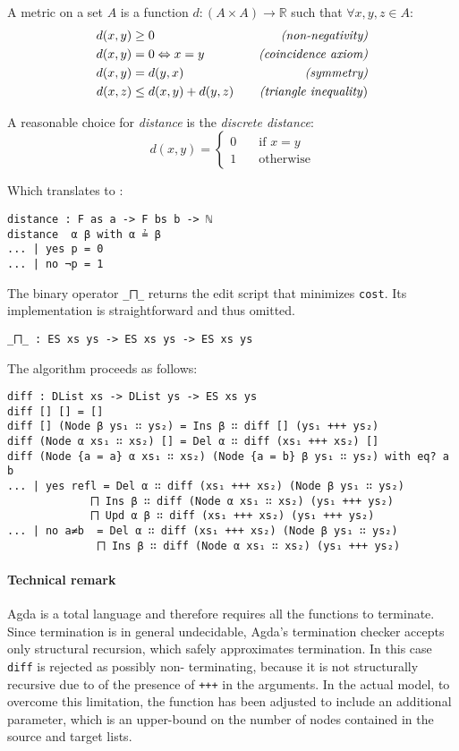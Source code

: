 \documentclass[../Thesis.tex]{subfiles}
\begin{document}
	A metric on a set $A$ is a function $d	 : (A \times A) \rightarrow \mathbb{R}$
	such that $\forall x, y, z \in A$:
	\begin{align*}
		d(x, y) &\geq 0 \quad &\mbox{\emph{{(non-negativity)}}}\\ 
		d(x, y) &= 0 \Leftrightarrow x = y \quad &\mbox{\emph{(coincidence axiom)}} \\		
		d(x, y) &= d(y, x) \quad &\mbox{\emph{(symmetry)}}\\
		d(x, z) &\leq d(x, y) + d(y, z) \quad &\mbox{\emph{(triangle inequality})}
	\end{align*}
	
	A reasonable choice for \emph{distance} is the \emph{discrete distance}:
	\[ d(x, y) = 
		\begin{cases} 
			0 \quad &\mbox{if } x = y \\
			1 \quad &\mbox {otherwise}		
		\end{cases} \]
		
	Which translates to : 		
\begin{verbatim}
distance : F as a -> F bs b -> ℕ
distance  α β with α ≟ β
... | yes p = 0
... | no ¬p = 1
\end{verbatim}
	
	The binary operator \texttt{\_⨅\_} returns the edit script that minimizes 	
	\texttt{cost}. Its implementation is straightforward and thus omitted.

\begin{verbatim}
_⨅_ : ES xs ys -> ES xs ys -> ES xs ys
\end{verbatim}

	The algorithm proceeds as follows:

\begin{verbatim}
diff : DList xs -> DList ys -> ES xs ys
diff [] [] = []
diff [] (Node β ys₁ ∷ ys₂) = Ins β ∷ diff [] (ys₁ +++ ys₂)
diff (Node α xs₁ ∷ xs₂) [] = Del α ∷ diff (xs₁ +++ xs₂) []
diff (Node {a = a} α xs₁ ∷ xs₂) (Node {a = b} β ys₁ ∷ ys₂) with eq? a b
... | yes refl = Del α ∷ diff (xs₁ +++ xs₂) (Node β ys₁ ∷ ys₂) 
             ⨅ Ins β ∷ diff (Node α xs₁ ∷ xs₂) (ys₁ +++ ys₂) 
             ⨅ Upd α β ∷ diff (xs₁ +++ xs₂) (ys₁ +++ ys₂)
... | no a≠b  = Del α ∷ diff (xs₁ +++ xs₂) (Node β ys₁ ∷ ys₂) 
              ⨅ Ins β ∷ diff (Node α xs₁ ∷ xs₂) (ys₁ +++ ys₂)
\end{verbatim}
	
	\paragraph{Technical remark}
	Agda is a total language and therefore requires all the functions to 
	terminate. Since termination is in general undecidable, Agda's termination 
	checker accepts only structural recursion, which safely approximates
	termination. In this case \texttt{diff} is rejected as possibly 
	non-	terminating, because it is not structurally recursive
	due to of the presence of \texttt{+++} in the arguments. 
	In the actual model, to overcome this limitation, the function has been 
	adjusted to include an additional parameter, which is an upper-bound 
	on the number of nodes contained in the source and target lists.
\end{document}
